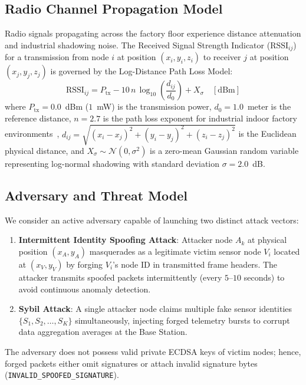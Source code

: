 \documentclass[journal]{IEEEtran}
\begin{document}
\subsection{Radio Channel Propagation Model}
Radio signals propagating across the factory floor experience distance attenuation and industrial shadowing noise. The Received Signal Strength Indicator ($\text{RSSI}_{ij}$) for a transmission from node $i$ at position $(x_i, y_i, z_i)$ to receiver $j$ at position $(x_j, y_j, z_j)$ is governed by the Log-Distance Path Loss Model:
\begin{equation}
\text{RSSI}_{ij} = P_{\text{tx}} - 10 \, n \, \log_{10} \left( \frac{d_{ij}}{d_0} \right) + X_{\sigma} \quad [\text{dBm}]
\end{equation}
where $P_{\text{tx}} = 0.0$~dBm ($1$~mW) is the transmission power, $d_0 = 1.0$~meter is the reference distance, $n = 2.7$ is the path loss exponent for industrial indoor factory environments~\cite{ref_rssi_fading_16}, $d_{ij} = \sqrt{(x_i-x_j)^2 + (y_i-y_j)^2 + (z_i-z_j)^2}$ is the Euclidean physical distance, and $X_{\sigma} \sim \mathcal{N}(0, \sigma^2)$ is a zero-mean Gaussian random variable representing log-normal shadowing with standard deviation $\sigma = 2.0$~dB.

\subsection{Adversary and Threat Model}
We consider an active adversary capable of launching two distinct attack vectors:
\begin{enumerate}
    \item \textbf{Intermittent Identity Spoofing Attack}: Attacker node $A_k$ at physical position $(x_A, y_A)$ masquerades as a legitimate victim sensor node $V_i$ located at $(x_V, y_V)$ by forging $V_i$'s node ID in transmitted frame headers. The attacker transmits spoofed packets intermittently (every $5$--$10$ seconds) to avoid continuous anomaly detection.
    \item \textbf{Sybil Attack}: A single attacker node claims multiple fake sensor identities $\{S_1, S_2, \dots, S_K\}$ simultaneously, injecting forged telemetry bursts to corrupt data aggregation averages at the Base Station.
\end{enumerate}

The adversary does not possess valid private ECDSA keys of victim nodes; hence, forged packets either omit signatures or attach invalid signature bytes (\texttt{INVALID\_SPOOFED\_SIGNATURE}).
\end{document}
